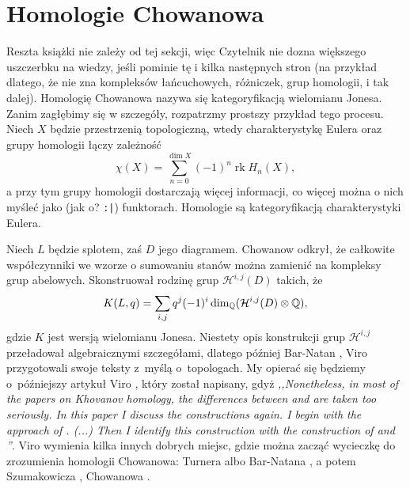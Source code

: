 
\section{Homologie Chowanowa}

Reszta książki nie zależy od tej sekcji, więc Czytelnik nie dozna większego uszczerbku na wiedzy, jeśli pominie tę i kilka następnych stron (na przykład dlatego, że nie zna kompleksów łańcuchowych, różniczek, grup homologii, i tak dalej).
Homologię Chowanowa nazywa się kategoryfikacją wielomianu Jonesa.
Zanim zagłębimy się w szczegóły, rozpatrzmy prostszy przykład tego procesu.
Niech $X$ będzie przestrzenią topologiczną, wtedy charakterystykę Eulera oraz grupy homologii łączy zależność
\begin{equation}
    \chi(X) = \sum_{n = 0}^{\dim X} (-1)^n \operatorname{rk} H_n(X),
\end{equation}
a przy tym grupy homologii dostarczają więcej informacji, co więcej można o nich myśleć jako (jak o? \texttt{:|}) funktorach.
Homologie są kategoryfikacją charakterystyki Eulera.

Niech $L$ będzie splotem, zaś $D$ jego diagramem.
Chowanow \cite{khovanov2000} odkrył, że całkowite współczynniki we wzorze o sumowaniu stanów można zamienić na kompleksy grup abelowych.
Skonstruował rodzinę grup $\mathcal H^{i, j}(D)$ takich, że
\begin{equation}
    K(L, q) = \sum_{i, j} q^j (-1)^i \dim_{\mathbb Q} (\mathcal H^{i, j}(D) \otimes \mathbb Q),
\end{equation}
gdzie $K$ jest wersją wielomianu Jonesa.
Niestety opis konstrukcji grup $\mathcal H^{i, j}$ przeładował algebraicznymi szczegółami, dlatego później Bar-Natan \cite{barnatan2002}, Viro \cite{viro2002} przygotowali swoje teksty z~myślą o~topologach.
%
%
My opierać się będziemy o~późniejszy artykuł Viro \cite{viro2004}, który został napisany, gdyż \emph{,,Nonetheless, in most of the papers on Khovanov homology, the differences between \cite{barnatan2002} and \cite{viro2002} are taken too seriously. In this paper I discuss the constructions again. I begin with the approach of \cite{viro2002}. (...) Then I identify this construction with the construction of \cite{barnatan2002} and \cite{khovanov2000}''}.
Viro \cite{viro2004} wymienia kilka innych dobrych miejsc, gdzie można zacząć wycieczkę do zrozumienia homologii Chowanowa: Turnera \cite{turner2017} albo Bar-Natana \cite{barnatan2002}, a potem Szumakowicza \cite{shumakovitch2012}, Chowanowa \cite{khovanov2000}.
%
%
%
%

